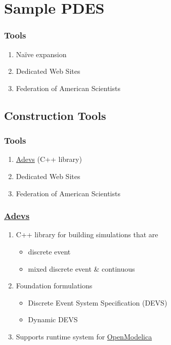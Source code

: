 % 

\section{Sample PDES}%
\begin{frame}\frametitle{Tools}
\begin{enumerate}
	\item Naïve expansion
	\item Dedicated Web Sites
	\item Federation of American Scientists
\end{enumerate}
\end{frame}

\subsection{Construction Tools}
\begin{frame}\frametitle{Tools}
\begin{enumerate}
	\item \href{https://en.wikipedia.org/wiki/Adevs}{Adevs} (C++ library)
	\item Dedicated Web Sites
	\item Federation of American Scientists
\end{enumerate}
\end{frame}

\begin{frame}\frametitle{\href{https://sourceforge.net/projects/adevs/}{Adevs}}
\begin{enumerate}
	\item C++ library for building simulations that are
	\begin{itemize}
		\item discrete event
		\item mixed discrete event \& continuous
	\end{itemize}
	\item Foundation formulations
	\begin{itemize}
		\item Discrete Event System Specification (DEVS)
		\item Dynamic DEVS
	\end{itemize}
	\item Supports runtime system for \href{https://openmodelica.org/}{OpenModelica}
\end{enumerate}
\end{frame}



